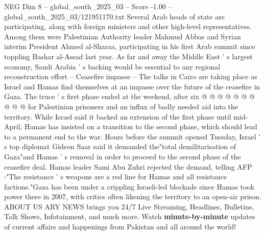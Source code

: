 \begin{textsample}{NEG Dim 8 – global\_south\_2025\_03 – Score -1.00 – global\_south\_2025\_03/121951170.txt}
Several Arab heads of state are participating, along with foreign ministers and other high-level representatives.
Among them were Palestinian Authority leader Mahmud Abbas and Syrian interim President Ahmed al-Sharaa, participating in his first Arab summit since toppling Bashar al-Assad last year.
As far and away the Middle East ' s largest economy, Saudi Arabia ' s backing would be essential to any regional reconstruction effort -- Ceasefire impasse -- The talks in Cairo are taking place as Israel and Hamas find themselves at an impasse over the future of the ceasefire in Gaza.
The truce ' s first phase ended at the weekend, after six @ @ @ @ @ @ @ @ @ @ for Palestinian prisoners and an influx of badly needed aid into the territory.
While Israel said it backed an extension of the first phase until mid-April, Hamas has insisted on a transition to the second phase, which should lead to a permanent end to the war.
Hours before the summit opened Tuesday, Israel ' s top diplomat Gideon Saar said it demanded the"total demilitarisation of Gaza"and Hamas ' s removal in order to proceed to the second phase of the ceasefire deal.
Hamas leader Sami Abu Zuhri rejected the demand, telling AFP :"The resistance ' s weapons are a red line for Hamas and all resistance factions."Gaza has been under a crippling Israeli-led blockade since Hamas took power there in 2007, with critics often likening the territory to an open-air prison.
ABOUT US ARY NEWS brings you 24/7 Live Streaming, Headlines, Bulletins, Talk Shows, Infotainment, and much more.
Watch \textbf{minute-by-minute} updates of current affairs and happenings from Pakistan and all around the world!

\end{textsample}
